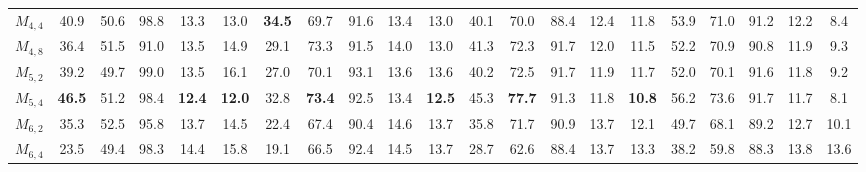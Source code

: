 \begin{table}[t]
{\begin{adjustbox}{width=1.3\textwidth,center}
\begin{tabular}{|c|ccccc|ccccc|ccccc|ccccc|}
                $M_{4,4}$       & 40.9                   & 50.6                   & 98.8                   &13.3      &13.0      & \textbf{34.5}          & 69.7                   & 91.6                   & 13.4     & 13.0           & 40.1                  &  70.0             & 88.4           & 12.4              &  11.8                     & 53.9                   & 71.0                   &  91.2                  & 12.2     & 8.4       \\
                $M_{4,8}$       & 36.4                   &51.5                    & 91.0                   &13.5      & 14.9     & 29.1                   & 73.3                   & 91.5                   & 14.0     & 13.0           & 41.3                  & 72.3              & 91.7           & 12.0              & 11.5                      & 52.2                   & 70.9                   & 90.8                   & 11.9     & 9.3       \\
                $M_{5,2}$       & 39.2                   &  49.7                  & 99.0                   & 13.5     & 16.1     & 27.0                   & 70.1                   & 93.1                   &13.6      & 13.6           & 40.2                  & 72.5              & 91.7           & 11.9              & 11.7                      & 52.0                   & 70.1                   & 91.6                   & 11.8     &9.2        \\
                $M_{5,4}$       & \textbf{46.5}          &   51.2                 & 98.4          & \textbf{12.4}     & \textbf{12.0}     & 32.8          & \textbf{73.4}          & 92.5                   & 13.4     & \textbf{12.5 } & 45.3                  & \textbf{77.7}              & 91.3           & 11.8              &  \textbf{10.8}            & 56.2                   & 73.6                  & 91.7                   & 11.7     & 8.1        \\
                $M_{6,2}$       & 35.3                   &  52.5                  & 95.8                   &13.7      & 14.5     & 22.4                   &   67.4                 & 90.4                   & 14.6     & 13.7           & 35.8                  & 71.7              & 90.9           & 13.7              & 12.1                      & 49.7                   & 68.1                   & 89.2                  & 12.7     &10.1        \\
                $M_{6,4}$       & 23.5                   &  49.4                  & 98.3                   & 14.4     &15.8      & 19.1                   & 66.5                   &92.4                    & 14.5     & 13.7           & 28.7                  & 62.6              & 88.4           & 13.7              &  13.3                     & 38.2                   & 59.8                   & 88.3                   & 13.8     & 13.6     \\

\end{tabular}
\end{adjustbox}}
\end{table}
